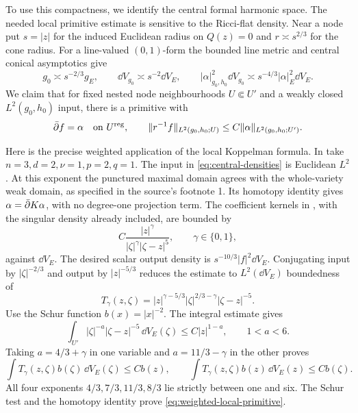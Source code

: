 To use this compactness, we identify the central formal
harmonic space. The needed local primitive estimate is
sensitive to the Ricci-flat density. Near a node put
$s=|z|$ for the induced Euclidean radius on $Q(z)=0$ and
$r\asymp s^{2/3}$ for the cone radius. For a line-valued
$(0,1)$-form the bounded line metric and central conical
asymptotics give
\begin{equation}\label{eq:central-densities}
 g_0\asymp s^{-2/3}g_E,
 \qquad \dd V_{g_0}\asymp s^{-2}\dd V_E,
 \qquad |\alpha|_{g_0,h_0}^2\dd V_{g_0}
                \asymp s^{-4/3}|\alpha|_E^2\dd V_E.
\end{equation}
We claim that for fixed nested node neighbourhoods
$U\Subset U'$ and a weakly closed $L^2(g_0,h_0)$ input,
there is a primitive with
\begin{equation}\label{eq:weighted-local-primitive}
 \bar\partial f=\alpha\quad\text{on }U^{\rm reg},\qquad
 \|r^{-1}f\|_{L^2(g_0,h_0;U)}
                     \le C\|\alpha\|_{L^2(g_0,h_0;U')}.
\end{equation}

Here is the precise weighted application of the local
Koppelman formula. In \cite[Theorem 1.3]{LR} take
$n=3,d=2,\nu=1,p=2,q=1$. The input in
\eqref{eq:central-densities} is Euclidean $L^2$.
At this exponent the punctured maximal domain agrees
with the whole-variety weak domain, as specified in the
source's footnote 1. Its homotopy identity gives
$\alpha=\bar\partial K\alpha$, with no degree-one projection
term. The coefficient kernels in
\cite[(3.1)--(3.2), Lemma 3.1 and (6.4)--(6.7)]{LR},
with the singular density already included, are bounded by
\[
 C\frac{|z|^\gamma}{|\zeta|^\gamma|\zeta-z|^5},
                              \qquad\gamma\in\{0,1\},
\]
against $\dd V_E$. The desired scalar output density is
$s^{-10/3}|f|^2\dd V_E$. Conjugating input by
$|\zeta|^{-2/3}$ and output by $|z|^{-5/3}$ reduces the
estimate to $L^2(\dd V_E)$ boundedness of
\[
 T_\gamma(z,\zeta)
   =|z|^{\gamma-5/3}|\zeta|^{2/3-\gamma}|\zeta-z|^{-5}.
\]
Use the Schur function $b(x)=|x|^{-2}$.
The integral estimate \cite[Lemma 2.5]{LR} gives
\[
 \int_{U'}|\zeta|^{-a}|\zeta-z|^{-5}\,\dd V_E(\zeta)
                  \le C|z|^{1-a},\qquad1<a<6.
\]
Taking $a=4/3+\gamma$ in one variable and
$a=11/3-\gamma$ in the other proves
\[
 \int T_\gamma(z,\zeta)b(\zeta)\,\dd V_E(\zeta)\le Cb(z),
 \qquad
 \int T_\gamma(z,\zeta)b(z)\,\dd V_E(z)\le Cb(\zeta).
\]
All four exponents $4/3,7/3,11/3,8/3$ lie strictly
between one and six. The Schur test and the homotopy
identity prove \eqref{eq:weighted-local-primitive}.

